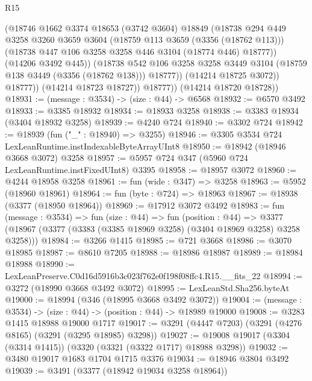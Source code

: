 \begin{lexlean}{R15}
\begin{coremodule}
                    (@18746
                      @1662
                      @3374
                      @18653
                      (@3742 @3604)
                      @18849
                      (@18738
                        @294
                        @449
                        @3258
                        @3260
                        @3659
                        @3604
                        (@18759 @113 @3659 (@3356 (@18762 @113)))
                        (@18738 @447 @106 @3258 @3258 @446 @3104 (@18774 @446) @18777))
                      (@14206 @3492 @445))
                    (@18738
                      @542
                      @106
                      @3258
                      @3258
                      @3449
                      @3104
                      (@18759 @138 @3449 (@3356 (@18762 @138)))
                      @18777))
                  (@14214 @18725 @3072))
                @18777))
            (@14214 @18723 @18727))
          @18777))
      (@14214 @18720 @18728))
@18931 := (message : @3534) -> (size : @44) -> @6568
@18932 := @6570 @3492
@18933 := @3385 @18932
@18934 := @18933 @3258
@18938 := @3383 @18934 (@3404 @18932 @3258)
@18939 := @4240 @724
@18940 := @3302 @724
@18942 := @18939 (fun ("_" : @18940) => @3255)
@18946 := @3305 @3534 @724 LexLeanRuntime.instIndexableByteArrayUInt8
@18950 := @18942 (@18946 @3668 @3072) @3258
@18957 := @5957 @724 @347 (@5960 @724 LexLeanRuntime.instFixedUInt8) @3395
@18958 := @18957 @3072
@18960 := @4244 @18958 @3258
@18961 := fun (wide : @347) => @3258
@18963 := @5952 (@18960 @18961)
@18964 := fun (byte : @724) => @18963
@18967 := @18938 (@3377 (@18950 @18964))
@18969 := @17912 @3072 @3492
@18983 := fun (message : @3534) =>
  fun (size : @44) =>
  fun (position : @44) =>
  @3377 (@18967 (@3377 (@3383 (@3385 @18969 @3258) (@3404 @18969 @3258) @3258 @3258)))
@18984 := @3266 @1415
@18985 := @721 @3668
@18986 := @3070 @18985
@18987 := @8610 @7205
@18988 := @18986 @18987
@18989 := @18984 @18988
@18990 := LexLeanPreserve.C0d16d5916b3c023f762e0f198f08ffc4.R15.__fits_22
@18994 := @3272 (@18990 @3668 @3492 @3072)
@18995 := LexLeanStd.Sha256.byteAt
@19000 := @18994 (@346 (@18995 @3668 @3492 @3072))
@19004 := (message : @3534) -> (size : @44) -> (position : @44) -> @18989 @19000
@19008 := @3283 @1415 @18988 @19000 @1717
@19017 := @3291 (@4447 @7203) (@3291 (@4276 @8165) (@3291 (@3295 @18985) @3298))
@19027 := @19008 @19017 (@3304 (@3314 @1415)) (@3320 (@3321 (@3322 @1717) @18988 @3298))
@19032 := @3480 @19017 @1683 @1704 @1715 @3376
@19034 := @18946 @3804 @3492
@19039 := @3491 (@3377 (@18942 @19034 @3258 @18964))

\end{coremodule}
\end{lexlean}
